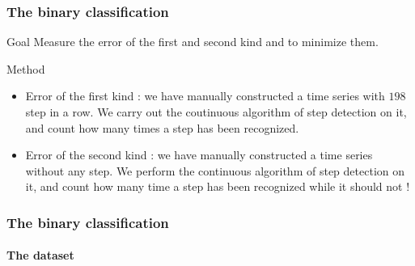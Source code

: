 \documentclass[11pt, sans]{beamer}
\begin{document}
\begin{frame}
\frametitle{The binary classification}

\begin{alertblock}{Goal}
Measure the error of the first and second kind and to minimize them.
\end{alertblock}

\begin{exampleblock}{Method}
\begin{itemize}
	\item Error of the first kind : we have manually constructed a time series with $198$ step in a row. We carry out the coutinuous algorithm of step detection on it, and count how many times a step has been recognized.
	\item Error of the second kind : we have manually constructed a time series without any step. We perform the continuous algorithm of step detection on it, and count how many time a step has been recognized while it should not !
\end{itemize}
\end{exampleblock}

\end{frame}

\begin{frame}
\frametitle{The binary classification}
\framesubtitle{The dataset}

	\begin{table}[h!]
    \centering
    \end{table}

\end{frame}
\end{document}
